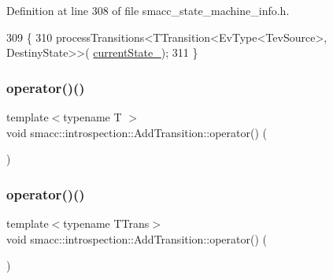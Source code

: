 Definition at line 308 of file smacc\+\_\+state\+\_\+machine\+\_\+info.\+h.


\begin{DoxyCode}
309 \{
310     processTransitions<TTransition<EvType<TevSource>, DestinyState>>(
      \hyperlink{structsmacc_1_1introspection_1_1AddTransition_a56fd9b1bdf6761bbe5258dc915481f4b}{currentState\_});
311 \}
\end{DoxyCode}
\mbox{\label{structsmacc_1_1introspection_1_1AddTransition_a3f9708b6493a5747fbe77361d9711daa}} 
\subsubsection{\texorpdfstring{operator()()}{operator()()}\hspace{0.1cm}{\footnotesize\ttfamily [3/4]}}
{\footnotesize\ttfamily template$<$typename T $>$ \\
void smacc\+::introspection\+::\+Add\+Transition\+::operator() (\begin{DoxyParamCaption}\item[{T}]{ }\end{DoxyParamCaption})}

\mbox{\label{structsmacc_1_1introspection_1_1AddTransition_abfe5dedcabfcc1fa94f767320f9089ab}} 
\subsubsection{\texorpdfstring{operator()()}{operator()()}\hspace{0.1cm}{\footnotesize\ttfamily [4/4]}}
{\footnotesize\ttfamily template$<$typename T\+Trans$>$ \\
void smacc\+::introspection\+::\+Add\+Transition\+::operator() (\begin{DoxyParamCaption}\item[{T\+Trans}]{ }\end{DoxyParamCaption})}



